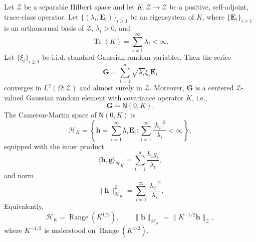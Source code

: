 \documentclass[11pt]{article}
\begin{document}
\begin{lemma}
\label{lem:trace_class_gaussian_cm_kl}
Let $\mathcal Z$ be a separable Hilbert space and let $K:\mathcal Z\to\mathcal Z$ be a positive, self-adjoint, trace-class operator. Let $\{(\lambda_i,\mathbf E_i)\}_{i\ge 1}$ be an eigensystem of $K$, where $\{\mathbf E_i\}_{i\ge 1}$ is an orthonormal basis of $\mathcal Z$,
$\lambda_i>0$, and
\[
    \operatorname{Tr}(K)
    =
    \sum_{i=1}^\infty \lambda_i
    <\infty .
\]
Let $\{\xi_i\}_{i\ge 1}$ be i.i.d. standard Gaussian random variables. Then the series
\[
    \mathbf G
    =
    \sum_{i=1}^\infty \sqrt{\lambda_i}\xi_i\mathbf E_i
\]
converges in $L^2(\Omega;\mathcal Z)$ and almost surely in $\mathcal Z$. Moreover, $\mathbf G$ is a centered $\mathcal Z$-valued Gaussian random element with covariance operator $K$, i.e.,
\[
    \mathbf G\sim \mathsf N(0,K).
\]
The Cameron-Martin space of $\mathsf N(0,K)$ is
\[
    \mathcal H_K=
    \left\{\mathbf h=\sum_{i=1}^\infty h_i\mathbf E_i:
        \sum_{i=1}^\infty \frac{|h_i|^2}{\lambda_i}<\infty
    \right\},
\]
equipped with the inner product
\[
\langle \mathbf h,\mathbf g\rangle_{\mathcal H_K} =\sum_{i=1}^\infty \frac{h_i g_i}{\lambda_i},
\]
and norm
\[
    \|\mathbf h\|_{\mathcal H_K}^2=\sum_{i=1}^\infty \frac{|h_i|^2}{\lambda_i}.
\]
Equivalently,
\[
    \mathcal H_K=\operatorname{Range}(K^{1/2}),
    \qquad
    \|\mathbf h\|_{\mathcal H_K}
    =
    \|K^{-1/2}\mathbf h\|_{\mathcal Z},
\]
where $K^{-1/2}$ is understood on $\operatorname{Range}(K^{1/2})$.
\end{lemma}
\end{document}
